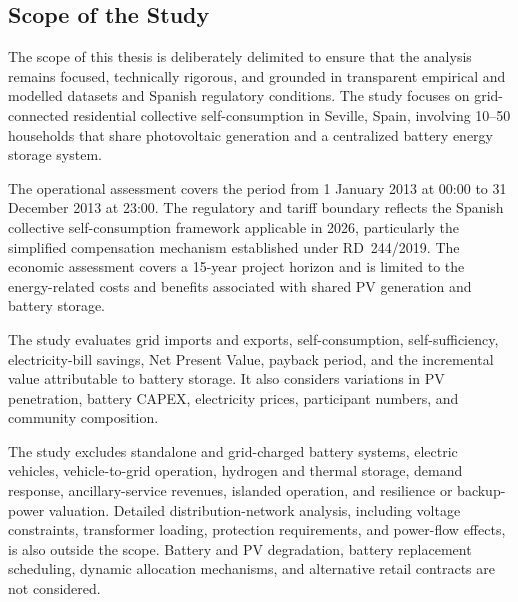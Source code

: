 \subsection{Scope of the Study}\label{scope-of-the-study}

The scope of this thesis is deliberately delimited to ensure that the
analysis remains focused, technically rigorous, and grounded in
transparent empirical and modelled datasets and Spanish regulatory
conditions. The study focuses on grid-connected residential collective
self-consumption in Seville, Spain, involving 10--50 households that
share photovoltaic generation and a centralized battery energy storage
system.

The operational assessment covers the period from 1 January 2013 at
00:00 to 31 December 2013 at 23:00. The regulatory and tariff boundary
reflects the Spanish collective self-consumption framework applicable in
2026, particularly the simplified compensation mechanism established
under RD~244/2019. The economic assessment covers a 15-year project
horizon and is limited to the energy-related costs and benefits
associated with shared PV generation and battery storage.

The study evaluates grid imports and exports, self-consumption,
self-sufficiency, electricity-bill savings, Net Present Value, payback
period, and the incremental value attributable to battery storage. It
also considers variations in PV penetration, battery CAPEX, electricity
prices, participant numbers, and community composition.

The study excludes standalone and grid-charged battery systems, electric
vehicles, vehicle-to-grid operation, hydrogen and thermal storage,
demand response, ancillary-service revenues, islanded operation, and
resilience or backup-power valuation. Detailed distribution-network
analysis, including voltage constraints, transformer loading, protection
requirements, and power-flow effects, is also outside the scope.
Battery and PV degradation, battery replacement scheduling, dynamic
allocation mechanisms, and alternative retail contracts are not
considered.

